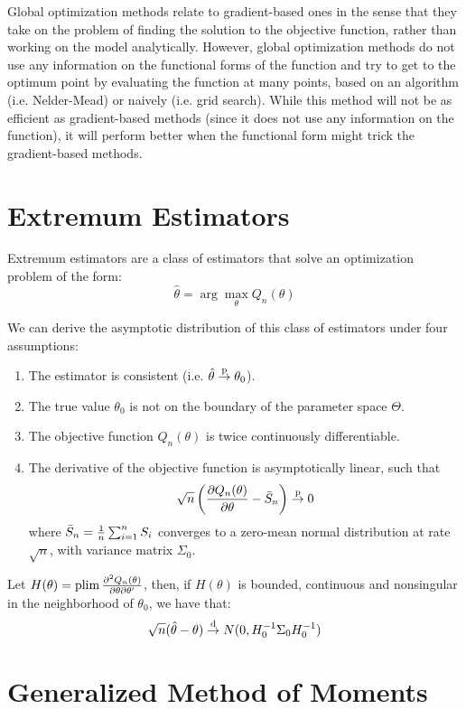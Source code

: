 Global optimization methods relate to gradient-based ones in the sense that they take on the problem of finding the solution to the objective function, rather than working on the model analytically. However, global optimization methods do not use any information on the functional forms of the function and try to get to the optimum point by evaluating the function at many points, based on an algorithm (i.e. Nelder-Mead) or naively (i.e. grid search). While this method will not be as efficient as gradient-based methods (since it does not use any information on the function), it will perform better when the functional form might trick the gradient-based methods.

\section{Extremum Estimators}

Extremum estimators are a class of estimators that solve an optimization problem of the form: $$\hat\theta = \arg\max_\theta Q_n(\theta) $$

We can derive the asymptotic distribution of this class of estimators under four assumptions:\begin{enumerate}
\item The estimator is consistent (i.e. $\hat\theta \overset{\text{p}}{\to} \theta_0$).
\item The true value $\theta_0$ is not on the boundary of the parameter space $\Theta$.
\item The objective function $Q_n(\theta)$ is twice continuously differentiable.
\item The derivative of the objective function is asymptotically linear, such that $$\sqrt{n}\left(\frac{\partial Q_n(\theta)}{\partial \theta} - \bar S_n\right) \overset{\text{p}}{\to} 0$$ where $\bar S_n = \frac{1}{n} \sum_{i=1}^{n} S_i$ converges to a zero-mean normal distribution at rate $\sqrt{n}$, with variance matrix $\Sigma_0$.
\end{enumerate}

Let $H(\theta) = \operatorname{plim} \frac{\partial^2 Q_n(\theta)}{\partial\theta\partial\theta'}$, then, if $H(\theta)$ is bounded, continuous and nonsingular in the neighborhood of $\theta_0$, we have that: $$\sqrt{n}(\hat\theta - \theta)\overset{\text{d}}{\to} N(0, H_0^{-1}\Sigma_0 H_0^{-1}) $$

\section{Generalized Method of Moments}

